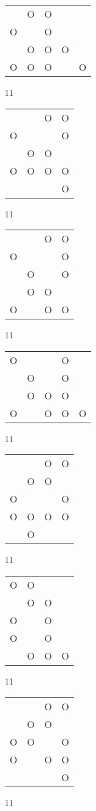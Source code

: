 \begin{tabular}{|m{0.2cm}m{0.2cm}m{0.2cm}m{0.2cm}m{0.2cm}|}\hline
 &O&O& & \\
O& &O& & \\
 &O&O&O& \\
O&O&O& &O\\
\hline\end{tabular}11
\begin{tabular}{|m{0.2cm}m{0.2cm}m{0.2cm}m{0.2cm}|}\hline
 & &O&O\\
O& & &O\\
 &O&O& \\
O&O&O&O\\
 & & &O\\
\hline\end{tabular}11
\begin{tabular}{|m{0.2cm}m{0.2cm}m{0.2cm}m{0.2cm}|}\hline
 & &O&O\\
O& & &O\\
 &O& &O\\
 &O&O& \\
O& &O&O\\
\hline\end{tabular}11
\begin{tabular}{|m{0.2cm}m{0.2cm}m{0.2cm}m{0.2cm}m{0.2cm}|}\hline
O& & &O& \\
 &O& &O& \\
 &O&O&O& \\
O& &O&O&O\\
\hline\end{tabular}11
\begin{tabular}{|m{0.2cm}m{0.2cm}m{0.2cm}m{0.2cm}|}\hline
 & &O&O\\
 &O&O& \\
O& & &O\\
O&O&O&O\\
 &O& & \\
\hline\end{tabular}11
\begin{tabular}{|m{0.2cm}m{0.2cm}m{0.2cm}m{0.2cm}|}\hline
O&O& & \\
 &O&O& \\
O& &O& \\
O& &O& \\
 &O&O&O\\
\hline\end{tabular}11
\begin{tabular}{|m{0.2cm}m{0.2cm}m{0.2cm}m{0.2cm}|}\hline
 & &O&O\\
 &O&O& \\
O&O& &O\\
O& &O&O\\
 & & &O\\
\hline\end{tabular}11
